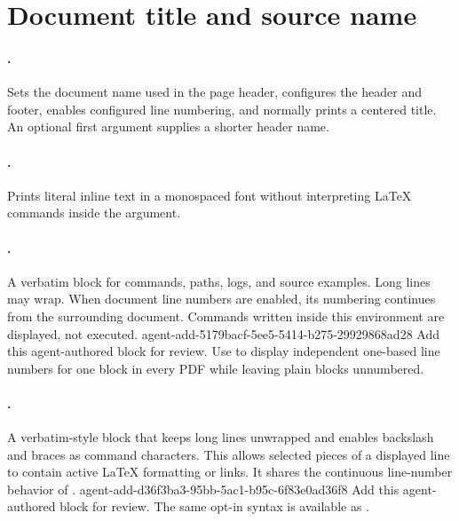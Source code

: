 %
\section*{Document title and source name}

\paragraph{\code{\docTitle}.}
Sets the document name used in the page header, configures the header and footer, enables configured line numbering, and normally prints a centered title.
An optional first argument supplies a shorter header name.

\begin{DocCode}
\end{DocCode}

\paragraph{\code{\code}.}
Prints literal inline text in a monospaced font without interpreting LaTeX commands inside the argument.

\paragraph{.}
A verbatim block for commands, paths, logs, and source examples.
Long lines may wrap.
When document line numbers are enabled, its numbering continues from the surrounding document.
Commands written inside this environment are displayed, not executed.
\agentProposedEdit
  {agent-add-5179bacf-5ee5-5414-b275-29929868ad28}
  {Add this agent-authored block for review.}
  {}
  {Use \code{\begin{DocCode}[numbered]} to display independent one-based line numbers for one block in every PDF while leaving plain blocks unnumbered.}

\paragraph{.}
A verbatim-style block that keeps long lines unwrapped and enables backslash and braces as command characters.
This allows selected pieces of a displayed line to contain active LaTeX formatting or links.
It shares the continuous line-number behavior of .
\agentProposedEdit
  {agent-add-d36f3ba3-95bb-5ac1-b95c-6f83e0ad36f8}
  {Add this agent-authored block for review.}
  {}
  {The same opt-in syntax is available as \code{\begin{LinkedDocCode}[numbered]}.}

